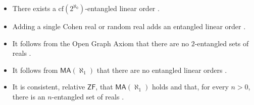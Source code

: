 \documentclass[12pt]{amsart}
\newtheorem{theorem}{Theorem}[section]
\theoremstyle{definition}
\theoremstyle{remark}
\begin{document}
%
%
%
%
%
%


\begin{itemize}
\itemsep0.4em
\item There exists a $\mathrm{cf}(2^{\aleph_0})$-entangled linear order \cite{MR799818, MR776283}.
\item Adding a single Cohen real or random real adds an entangled linear order \cite[p. 55]{MR980949}.
\item It follows from the Open Graph Axiom that there are no $2$-entangled sets of reals \cite[Proposition 8.4]{MR980949}.
\item It follows from $\mathsf{MA}(\aleph_1)$ that there are no entangled linear orders \cite{avraham1981martin}.
\item It is consistent, relative  $\mathsf{ZF}$, that $\mathsf{MA}(\aleph_1)$ holds and that, for every $n > 0$, there is an $n$-entangled set of reals \cite{MR801036}.
\end{itemize}
\end{document}
